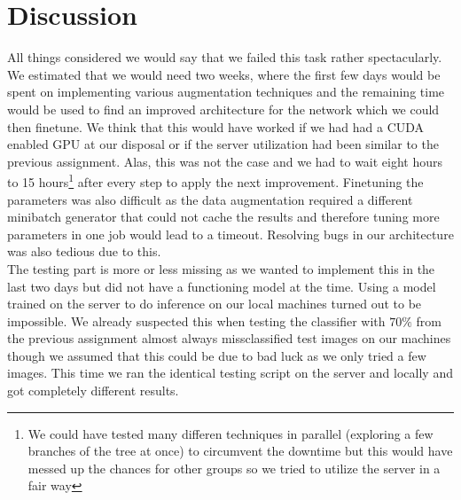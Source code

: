 \section{Discussion}
All things considered we would say that we failed this task rather spectacularly. We estimated that we would need two weeks, where the first few days would be spent on implementing various augmentation techniques and the remaining time would be used to find an improved architecture for the network which we could then finetune. We think that this would have worked if we had had a CUDA enabled GPU at our disposal or if the server utilization had been similar to the previous assignment. Alas, this was not the case and we had to wait eight hours to 15 hours\footnote{We could have tested many differen techniques in parallel (exploring a few branches of the tree at once) to circumvent the downtime but this would have messed up the chances for other groups so we tried to utilize the server in a fair way} after every step to apply the next improvement. Finetuning the parameters was also difficult as the data augmentation required a different minibatch generator that could not cache the results and therefore tuning more parameters in one job would lead to a timeout. Resolving bugs in our architecture was also tedious due to this.
\\
The testing part is more or less missing as we wanted to implement this in the last two days but did not have a functioning model at the time. Using a model trained on the server to do inference on our local machines turned out to be impossible. We already suspected this when testing the classifier with $70\%$ from the previous assignment almost always missclassified test images on our machines though we assumed that this could be due to bad luck as we only tried a few images. This time we ran the identical testing script on the server and locally and got completely different results.  

